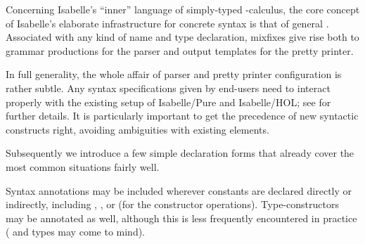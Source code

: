 %
\begin{isabellebody}%
\def\isabellecontext{Documents}%
\isamarkupfalse%
%
\isamarkuptrue%
%
\begin{isamarkuptext}%
Concerning Isabelle's ``inner'' language of simply-typed \isa{{\isasymlambda}}-calculus, the core concept of Isabelle's elaborate infrastructure
  for concrete syntax is that of general .
  Associated with any kind of name and type declaration, mixfixes give
  rise both to grammar productions for the parser and output templates
  for the pretty printer.

  In full generality, the whole affair of parser and pretty printer
  configuration is rather subtle.  Any syntax specifications given by
  end-users need to interact properly with the existing setup of
  Isabelle/Pure and Isabelle/HOL; see \cite{isabelle-ref} for further
  details.  It is particularly important to get the precedence of new
  syntactic constructs right, avoiding ambiguities with existing
  elements.

  \medskip Subsequently we introduce a few simple declaration forms
  that already cover the most common situations fairly well.%
\end{isamarkuptext}%
\isamarkuptrue%
%
\isamarkuptrue%
%
\begin{isamarkuptext}%
Syntax annotations may be included wherever constants are declared
  directly or indirectly, including ,
  , or  (for the
  constructor operations).  Type-constructors may be annotated as
  well, although this is less frequently encountered in practice
  (\isa{{\isacharasterisk}} and \isa{{\isacharplus}} types may come to mind).


\end{isamarkuptext}
\end{isabellebody}
